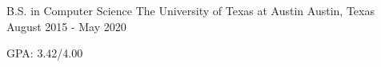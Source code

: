 


\begin{cventries}


\cventry
{B.S. in Computer Science} %
{The University of Texas at Austin} %
{Austin, Texas} %
{August 2015 - May 2020} %
{ %
\begin{cvitems}
\item{GPA: 3.42/4.00}
\end{cvitems}
}


\end{cventries}